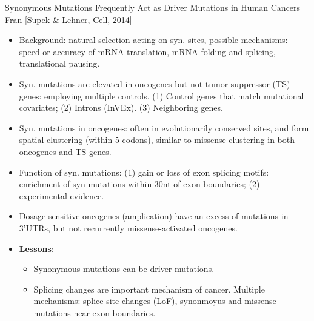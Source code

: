 \documentclass{report}
\begin{document}
Synonymous Mutations Frequently Act as Driver Mutations in Human Cancers
Fran [Supek \& Lehner, Cell, 2014]
\begin{itemize}
	\item Background: natural selection acting on syn. sites, possible mechanisms: speed or accuracy of mRNA translation, mRNA folding and splicing, translational pausing. 
	
	\item Syn. mutations are elevated in oncogenes but not tumor suppressor (TS) genes: employing multiple controls. (1) Control genes that match mutational covariates; (2) Introns (InVEx). (3) Neighboring genes.  
	
	\item Syn. mutations in oncogenes: often in evolutionarily conserved sites, and form spatial clustering (within 5 codons), similar to missense clustering in both oncogenes and TS genes. 
	
	\item Function of syn. mutations: (1) gain or loss of exon splicing motifs: enrichment of syn mutations within 30nt of exon boundaries; (2) experimental evidence. 
	
	\item Dosage-sensitive oncogenes (amplication) have an excess of mutations in 3'UTRs, but not recurrently missense-activated oncogenes. 
	
	\item \textbf{Lessons}: 
	\begin{itemize}
		\item Synonymous mutations can be driver mutations. 
		\item Splicing changes are important mechanism of cancer. Multiple mechanisms: splice site changes (LoF), synonmoyus and missense mutations near exon boundaries. 
	\end{itemize}
\end{itemize}
\end{document}
